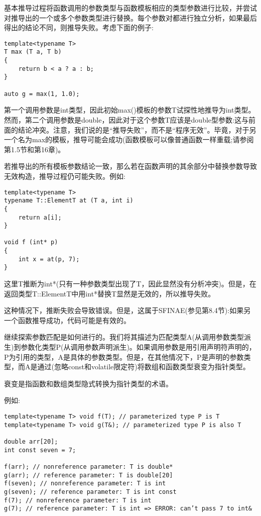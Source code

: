 基本推导过程将函数调用的参数类型与函数模板相应的类型参数进行比较，并尝试对推导出的一个或多个参数类型进行替换。每个参数对都进行独立分析，如果最后得出的结论不同，则推导失败。考虑下面的例子:
 
\begin{lstlisting}[style=styleCXX]
template<typename T>
T max (T a, T b)
{
	return b < a ? a : b;
}

auto g = max(1, 1.0);
\end{lstlisting} 
 
第一个调用参数是int类型，因此初始max()模板的参数T试探性地推导为int类型。然而，第二个调用参数是double，因此对于这个参数T应该是double型参数:这与前面的结论冲突。注意，我们说的是“推导失败”，而不是“程序无效”。毕竟，对于另一个名为max的模板，推导可能会成功(函数模板可以像普通函数一样重载;请参阅第1.5节和第16章)。
 
若推导出的所有模板参数结论一致，那么若在函数声明的其余部分中替换参数导致无效构造，推导过程仍可能失败。例如:

\begin{lstlisting}[style=styleCXX]
template<typename T>
typename T::ElementT at (T a, int i)
{
	return a[i];
}

void f (int* p)
{
	int x = at(p, 7);
}
\end{lstlisting} 

这里T推断为int*(只有一种参数类型出现了T，因此显然没有分析冲突)。但是，在返回类型T::ElementT中用int*替换T显然是无效的，所以推导失败。

\begin{tcolorbox}[colback=webgreen!5!white,colframe=webgreen!75!black]
\hspace*{0.75cm}这种情况下，推断失败会导致错误。但是，这属于SFINAE(参见第8.4节):如果另一个函数推导成功，代码可能是有效的。
\end{tcolorbox}

继续探索参数匹配是如何进行的。我们将其描述为匹配类型A(从调用参数类型派生)到参数化类型P(从调用参数声明派生)。如果调用参数是用引用声明符声明的，P为引用的类型，A是具体的参数类型。但是，在其他情况下，P是声明的参数类型，而A是通过(忽略const和volatile限定符)将数组和函数类型衰变为指针类型。

\begin{tcolorbox}[colback=webgreen!5!white,colframe=webgreen!75!black]
\hspace*{0.75cm}衰变是指函数和数组类型隐式转换为指针类型的术语。
\end{tcolorbox}

例如:

\begin{lstlisting}[style=styleCXX]
template<typename T> void f(T); // parameterized type P is T
template<typename T> void g(T&); // parameterized type P is also T

double arr[20];
int const seven = 7;

f(arr); // nonreference parameter: T is double*
g(arr); // reference parameter: T is double[20]
f(seven); // nonreference parameter: T is int
g(seven); // reference parameter: T is int const
f(7); // nonreference parameter: T is int
g(7); // reference parameter: T is int => ERROR: can’t pass 7 to int&
\end{lstlisting} 

